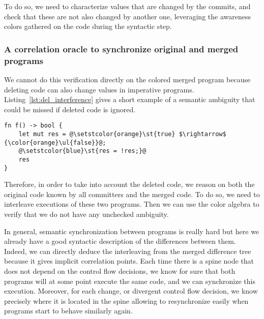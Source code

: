 \documentclass[a4paper,11pt]{article}
\begin{document}
To do so, we need to characterize values that are changed by the commits, and check that these are not also changed by another one, leveraging the awareness colors gathered on the code during the syntactic step.

\subsubsection{A correlation oracle to synchronize original and merged programs}

We cannot do this verification directly on the colored merged program because
deleting code can also change values in imperative programs. Listing~\ref{lst:del_interference} gives a short example of a semantic ambiguity that could be missed if deleted code is ignored.
\begin{lstlisting}[label=lst:del_interference, caption={Example of an ambiguity that would be missed if we don't analyze deleted code.}]
fn f() -> bool {
    let mut res = @\setstcolor{orange}\st{true} $\rightarrow$ {\color{orange}\ul{false}}@;
    @\setstcolor{blue}\st{res = !res;}@
    res
}
\end{lstlisting}

Therefore, in order to take into account the deleted code, we reason
on both the original code known by all committers and the merged code.
To do so, we need to interleave executions of these two programs. Then we can use the color algebra to verify that we do not have any unchecked ambiguity.

In general, semantic synchronization between programs is really hard
but here we already have a good syntactic description of the
differences between them. Indeed, we can directly deduce the interleaving from
the merged difference tree because it gives implicit correlation
points. Each time there is a spine node that does not depend
on the control flow decisions, we know for sure that both programs
will at some point execute the same code, and we can synchronize this
execution. Moreover, for each change, or divergent control flow
decision, we know precisely where it is located in the spine allowing
to resynchronize easily when programs start to behave similarly again.
\end{document}
